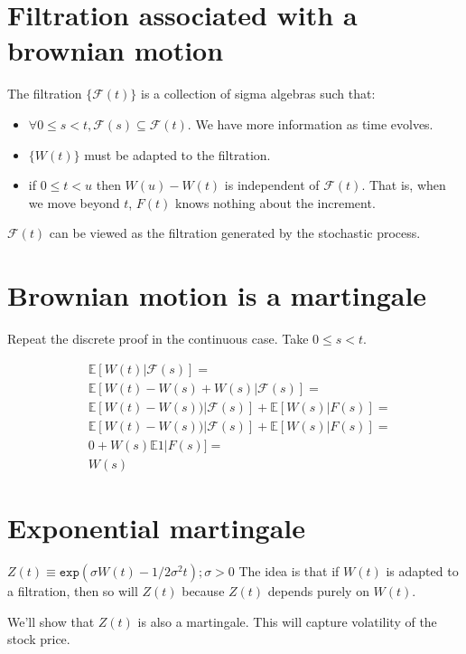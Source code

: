 \documentclass{book}
\newcommand{\F}{\ensuremath{\mathcal{F}}}
\newcommand{\E}{\ensuremath{\mathbb{E}}}
\theoremstyle{definition}
\begin{document}
\section{Filtration associated with a brownian motion}

The filtration $\{ \F(t) \}$ is a collection of sigma algebras such that:
\begin{itemize}
 \item $\forall 0 \leq s < t,  \F(s) \subseteq \F(t)$. We have more information as time evolves.
\item $\{ W(t) \}$ must be adapted to the filtration.
\item if $0 \leq t < u$ then $W(u) - W(t)$ is independent of $\F(t)$. That is,
    when we move beyond $t$, $F(t)$ knows nothing about the increment.
 \end{itemize}
 $\F(t)$ can be viewed as the filtration generated by the stochastic process.

\section{Brownian motion is a martingale}

Repeat the discrete proof in the continuous case. Take $0 \leq s < t$.

\begin{align*}
& \E[W(t) | \F(s)] = \\
& \E[W(t) - W(s) + W(s) | \F(s)] = \\
& \E[W(t) - W(s)) | \F(s)] + \E[W(s)|F(s)] = \\
& \E[W(t) - W(s)) | \F(s)] + \E[W(s)|F(s)] = \\
& 0 + W(s) \E1|F(s)] = \\
& W(s)                    
\end{align*}

\section{Exponential martingale}

$Z(t)  \equiv \texttt{exp}\left( \sigma W(t) - 1/2 \sigma^2 t \right); \sigma > 0$
The idea is that if $W(t)$ is adapted to a filtration, then so will $Z(t)$
because $Z(t)$ depends purely on $W(t)$.

We'll show that $Z(t)$ is also a martingale. This will capture volatility of
the stock price.
\end{document}
